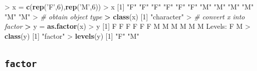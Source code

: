 \documentclass[]{article}
\newenvironment{Shaded}{\begin{snugshade}}{\end{snugshade}}
\newcommand{\KeywordTok}[1]{\textcolor[rgb]{0.13,0.29,0.53}{\textbf{{#1}}}}
\newcommand{\DecValTok}[1]{\textcolor[rgb]{0.00,0.00,0.81}{{#1}}}
\newcommand{\StringTok}[1]{\textcolor[rgb]{0.31,0.60,0.02}{{#1}}}
\newcommand{\CommentTok}[1]{\textcolor[rgb]{0.56,0.35,0.01}{\textit{{#1}}}}
\newcommand{\ErrorTok}[1]{\textcolor[rgb]{0.64,0.00,0.00}{\textbf{{#1}}}}
\newcommand{\NormalTok}[1]{{#1}}
\begin{document}
\begin{Shaded}
\begin{Highlighting}[]
\NormalTok{>}\StringTok{ }\NormalTok{x =}\StringTok{ }\KeywordTok{c}\NormalTok{(}\KeywordTok{rep}\NormalTok{(}\StringTok{'F'}\NormalTok{,}\DecValTok{6}\NormalTok{),}\KeywordTok{rep}\NormalTok{(}\StringTok{'M'}\NormalTok{,}\DecValTok{6}\NormalTok{))}
\NormalTok{>}\StringTok{ }\NormalTok{x}
 \NormalTok{[}\DecValTok{1}\NormalTok{] }\StringTok{"F"} \StringTok{"F"} \StringTok{"F"} \StringTok{"F"} \StringTok{"F"} \StringTok{"F"} \StringTok{"M"} \StringTok{"M"} \StringTok{"M"} \StringTok{"M"} \StringTok{"M"} \StringTok{"M"}
\NormalTok{>}\StringTok{ }\CommentTok{# obtain object type}
\ErrorTok{>}\StringTok{ }\KeywordTok{class}\NormalTok{(x)}
\NormalTok{[}\DecValTok{1}\NormalTok{] }\StringTok{"character"}
\NormalTok{>}\StringTok{ }\CommentTok{# convert x into factor}
\ErrorTok{>}\StringTok{ }\NormalTok{y =}\StringTok{ }\KeywordTok{as.factor}\NormalTok{(x)}
\NormalTok{>}\StringTok{ }\NormalTok{y}
 \NormalTok{[}\DecValTok{1}\NormalTok{] F F F F F F M M M M M M}
\NormalTok{Levels:}\StringTok{ }\NormalTok{F M}
\NormalTok{>}\StringTok{ }\KeywordTok{class}\NormalTok{(y)}
\NormalTok{[}\DecValTok{1}\NormalTok{] }\StringTok{"factor"}
\NormalTok{>}\StringTok{ }\KeywordTok{levels}\NormalTok{(y)}
\NormalTok{[}\DecValTok{1}\NormalTok{] }\StringTok{"F"} \StringTok{"M"}
\end{Highlighting}
\end{Shaded}

\subsection{\texorpdfstring{\texttt{factor}}{factor}}\label{factor-1}
\end{document}
